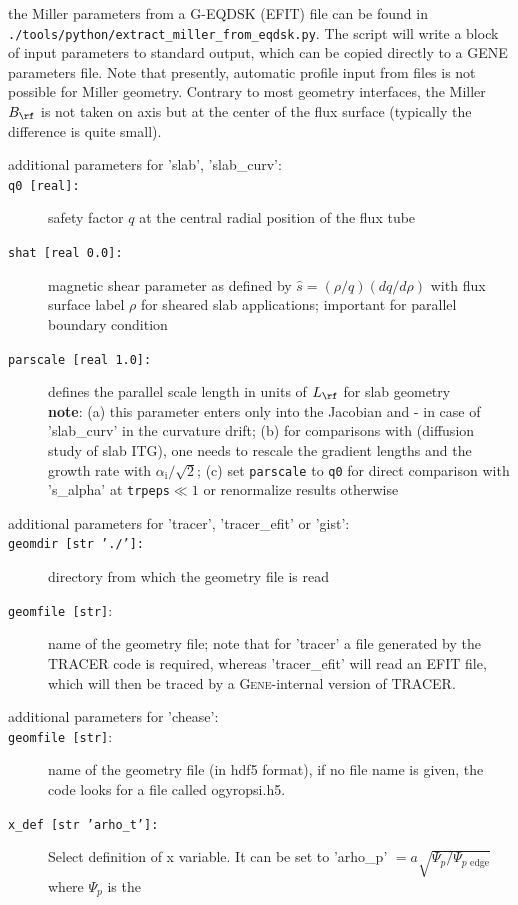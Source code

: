 \documentclass[12pt]{article}
\begin{document}
the Miller parameters from a G-EQDSK (EFIT) file can be found in {\tt ./tools/python/extract\_miller\_from\_eqdsk.py}.
The script will write a block of input parameters to standard output, which can be copied directly
to a GENE parameters file. Note that presently, automatic profile input from files is not possible for Miller geometry.
Contrary to most geometry interfaces, the Miller $B_\rf$ is not taken on axis but at the center
of the flux surface (typically the difference is quite small).
%
\begin{description}
\item[additional parameters for 'slab', 'slab\_curv':]
\item[\hypertarget{q0}{\texttt{q0 [real]:}}] safety factor $q$ at the central radial position of the flux tube
\item[\texttt{shat [real 0.0]:}] magnetic shear parameter as defined by $\hat s=(\rho/q)(dq/d\rho)$ with flux surface label $\rho$
for sheared slab applications; important for parallel boundary condition
\item[\texttt{parscale [real 1.0]:}] defines the parallel scale length
in units of $L_\rf$ for slab geometry\\
\textbf{note}: (a) this parameter enters only into the Jacobian and - in case of 'slab\_curv' in the curvature drift; (b) for
comparisons with \cite{diffusion} (diffusion study of slab ITG), one needs to
rescale the gradient lengths and the growth rate with $\alpha_\mathrm{i} / \sqrt{2}$;
(c) set {\tt parscale} to {\tt q0} for direct comparison with 's\_alpha' at {\tt trpeps}$\ll 1$ or renormalize results otherwise
%
\item[additional parameters for 'tracer', 'tracer\_efit' or 'gist':]
\item[\texttt{geomdir [str './']:}] directory from which the geometry file is read
\item[\texttt{geomfile [str]}:] name of the geometry file; note that for 'tracer' a file generated by
the TRACER code is required, whereas 'tracer\_efit' will read an EFIT file, which will then be traced
by a \textsc{Gene}-internal version of TRACER.
\item[additional parameters for 'chease':]
\item[\texttt{geomfile [str]}:] name of the geometry file (in hdf5 format), if
  no file name is given, the code looks for a file called ogyropsi.h5.
\item[\texttt{x\_def [str 'arho\_t']:}] Select definition of x variable.  It can be
  set to 'arho\_p' $=a \sqrt{\Psi_p / \Psi_{p\mbox{ edge}}}$ where $\Psi_p$ is the

\end{description}
\end{document}
